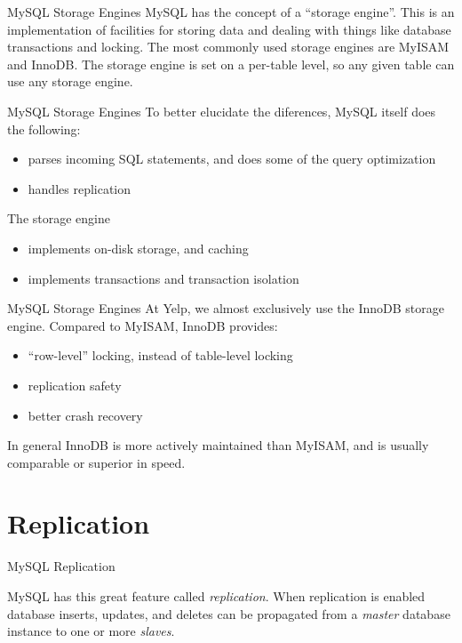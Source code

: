 \documentclass[14pt]{beamer}
\begin{document}
\begin{frame}{MySQL Storage Engines}
  MySQL has the concept of a ``storage engine''. This is an implementation of
  facilities for storing data and dealing with things like database transactions
  and locking.
  \newline
  \newline
  The most commonly used storage engines are MyISAM and InnoDB. The storage
  engine is set on a per-table level, so any given table can use any storage
  engine.
\end{frame}

\begin{frame}{MySQL Storage Engines}
  To better elucidate the diferences, MySQL itself does the following:
  \begin{itemize}
    \item parses incoming SQL statements, and does some of the query optimization
    \item handles replication
  \end{itemize}
  The storage engine
  \begin{itemize}
    \item implements on-disk storage, and caching
    \item implements transactions and transaction isolation
  \end{itemize}
\end{frame}

\begin{frame}{MySQL Storage Engines}
  At Yelp, we
  almost exclusively use the InnoDB storage engine. Compared to MyISAM, InnoDB provides:
  \begin{itemize}
    \item ``row-level'' locking, instead of table-level locking
    \item replication safety
    \item better crash recovery
  \end{itemize}
  In general InnoDB is more actively maintained than MyISAM, and is usually
  comparable or superior in speed.
\end{frame}

\section{Replication}

\begin{frame}{MySQL Replication}

  MySQL has this great feature called \emph{replication}.
  \newline
  \newline
  When replication is
  enabled database inserts, updates, and deletes can be propagated from a \emph{master} database
  instance to one or more \emph{slaves}.
\end{frame}
\end{document}
